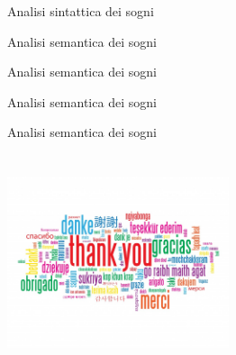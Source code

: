 \documentclass[xcolor=x11names,compress]{beamer}
\begin{document}
\begin{frame}[t]{Analisi sintattica dei sogni}
    \vspace{-0.5cm}
    
\end{frame}

\begin{frame}[t]{Analisi semantica dei sogni}
    
\end{frame}

\begin{frame}[t]{Analisi semantica dei sogni}
    
\end{frame}

\begin{frame}[t]{Analisi semantica dei sogni}
    
\end{frame}

\begin{frame}[t]{Analisi semantica dei sogni}
    
\end{frame}


\section*{}
\appendix
\begin{frame}{}
\begin{center}
\includegraphics[width=6.5cm]{./immagini/thanks}
\end{center}
\end{frame}
\end{document}
